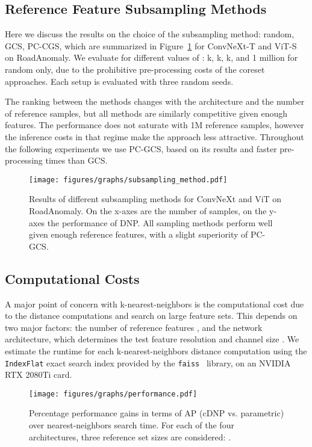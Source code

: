 \documentclass[10pt,twocolumn,letterpaper]{article}
\begin{document}
\subsection{Reference Feature Subsampling Methods}
\label{sec:ablation_subsampling}
Here we discuss the results on the choice of the subsampling method: random, GCS, PC-CGS, which are summarized in Figure~\ref{fig:ablation-sampling} for ConvNeXt-T and ViT-S on RoadAnomaly. We evaluate for different values of : k, k, k, and 1 million for random only, due to the prohibitive pre-processing costs of the coreset approaches. Each setup is evaluated with three random seeds.

The ranking between the methods changes with the architecture and the number of reference samples, but all methods are similarly competitive given enough features. The performance does not saturate with 1M reference samples, however the inference costs in that regime make the approach less attractive.
Throughout the following experiments we use PC-GCS, based on its results and faster pre-processing times than GCS.

\begin{figure}
    \centering
    \texttt{[image: figures/graphs/subsampling\_method.pdf]}
    \caption{Results of different subsampling methods for ConvNeXt and ViT on RoadAnomaly. On the x-axes are the number of samples, on the y-axes the performance of DNP. All sampling methods perform well given enough reference features, with a slight superiority of PC-GCS.}
    \label{fig:ablation-sampling}
\end{figure}


\subsection{Computational Costs}
A major point of concern with k-nearest-neighbors is the computational cost due to the distance computations and search on large feature sets. This depends on two major factors: the number of reference features , and the network architecture, which determines the test feature resolution  and channel size . We estimate the runtime for each k-nearest-neighbors distance computation using the \texttt{IndexFlat} exact search index provided by the \texttt{faiss}~\cite{johnson2019billion} library, on an NVIDIA RTX 2080Ti card.

\begin{figure}[t]
    \centering
    \texttt{[image: figures/graphs/performance.pdf]}
    \vspace{-0.8em}
    \caption{
    Percentage performance gains in terms of AP (cDNP vs. parametric) over nearest-neighbors search time. For each of the four architectures, three reference set sizes are considered: .}
    \label{fig:overhead_vs_ap}
\end{figure}
\end{document}

